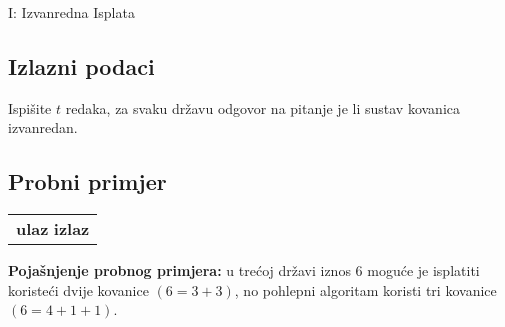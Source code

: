 \begin{statement}[
  timelimit=1 s,
  memorylimit=512 MiB,
]{I: Izvanredna Isplata}
\subsection*{Izlazni podaci}
Ispišite $t$ redaka, za svaku državu odgovor na pitanje je li sustav
kovanica izvanredan.

\subsection*{Probni primjer}
\begin{tabularx}{\textwidth}{X}
  \textbf{ulaz}
  \linespread{1}{}
  \textbf{izlaz}
  \linespread{1}{}
\end{tabularx}
\textbf{Pojašnjenje probnog primjera:} u trećoj državi iznos $6$ moguće je
isplatiti koristeći dvije kovanice $(6 = 3 + 3)$, no pohlepni algoritam koristi
tri kovanice $(6 = 4 + 1 + 1)$.

\end{statement}

